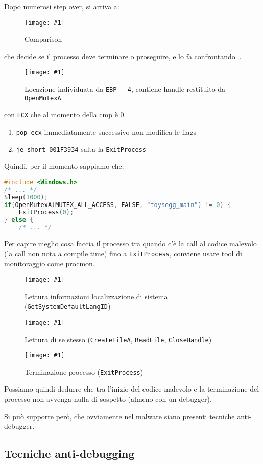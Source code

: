 \documentclass[
    a4paper, %
    11pt %
]{article}
\newcommand{\pic}[4]{\begin{figure}[H]
            \centering
            \texttt{[image: \#1]}
            \caption{#2}
            \label{fig:#1}
            \end{figure}}
\begin{document}
            Dopo numerosi step over, si arriva a:

            \pic{cmp}{Comparison}{9cm}{1.5cm}

            che decide se il processo deve terminare o proseguire, e lo fa confrontando...

            \pic{ebpmin4}{Locazione individuata da \texttt{EBP - 4}, contiene handle restituito da 
            \texttt{OpenMutexA}}{10cm}{2cm}

            con \texttt{ECX} che al momento della cmp è 0.

            \begin{enumerate}
                \item \texttt{pop ecx} immediatamente successivo non modifica le flags
                \item \texttt{je short 001F3934} salta la \texttt{ExitProcess}
            \end{enumerate}

            Quindi, per il momento sappiamo che:

            \begin{lstlisting}[language=C]
#include <Windows.h>
/* ... */
Sleep(1000);
if(OpenMutexA(MUTEX_ALL_ACCESS, FALSE, "toysegg_main") != 0) {
    ExitProcess(0);
} else {
    /* ... */
            \end{lstlisting}

            Per capire meglio cosa faccia il processo tra quando c'è la call al codice malevolo (la call non nota a compile time) fino a 
            \texttt{ExitProcess}, conviene usare tool di monitoraggio come procmon.

            \pic{getlocale}{Lettura informazioni localizzazione di sistema 
            (\texttt{GetSystemDefaultLangID})}{15cm}{4cm}
            \pic{readitself}{Lettura di se stesso (\texttt{CreateFileA}, \texttt{ReadFile}, 
            \texttt{CloseHandle})}{13cm}{1cm}
            \pic{exitproc}{Terminazione processo (\texttt{ExitProcess})}{15cm}{6cm}

            Possiamo quindi dedurre che tra l'inizio del codice malevolo e la terminazione del processo
            non avvenga nulla di sospetto (almeno con un debugger).

            Si può supporre però, che ovviamente nel malware siano presenti tecniche anti-debugger.

            \subsection{Tecniche anti-debugging}
\end{document}
